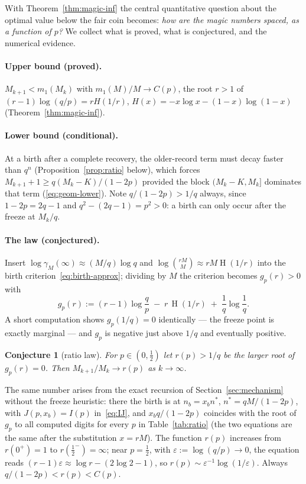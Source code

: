 \documentclass[11pt]{article}
\newtheorem{conjecture}[theorem]{Conjecture}
\theoremstyle{definition}
\DeclareMathOperator{\Hent}{H}
\begin{document}
With Theorem~\ref{thm:magic-inf} the central quantitative question
about the optimal value below the fair coin becomes: \emph{how are the
magic numbers spaced, as a function of $p$?}  We collect what is
proved, what is conjectured, and the numerical evidence.

\paragraph{Upper bound (proved).}  $M_{k+1}<m_1(M_k)$ with
$m_1(M)/M\to C(p)$, the root $r>1$ of $(r-1)\log(q/p)=rH(1/r)$,
$H(x)=-x\log x-(1-x)\log(1-x)$ (Theorem~\ref{thm:magic-inf}).

\paragraph{Lower bound (conditional).}  At a birth after a complete
recovery, the older-record term must decay faster than $q^n$
(Proposition~\ref{prop:ratio} below), which forces
$M_{k+1}+1\ge q(M_k-K)/(1-2p)$ provided the block $(M_k-K,M_k]$
dominates that term (\eqref{eq:geom-lower}).  Note
$q/(1-2p)>1/q$ always, since $1-2p=2q-1$ and $q^2-(2q-1)=p^2>0$: a
birth can only occur after the freeze at $M_k/q$.

\paragraph{The law (conjectured).}  Insert
$\log\gamma_M(\infty)\approx(M/q)\log q$ and $\log\binom{rM}{M}\approx rM\Hent(1/r)$
into the birth criterion~\eqref{eq:birth-approx}; dividing by $M$ the
criterion becomes $g_p(r)>0$ with
\begin{equation}\label{eq:g}
  g_p(r):=(r-1)\log\frac qp\;-\;r\,\Hent(1/r)\;+\;\frac1q\log\frac1q .
\end{equation}
A short computation shows $g_p(1/q)=0$ identically --- the freeze point
is exactly marginal --- and $g_p$ is negative just above $1/q$ and
eventually positive.

\begin{conjecture}[ratio law]\label{conj:ratio}
  For $p\in(0,\tfrac12)$ let $r(p)>1/q$ be the larger root of
  $g_p(r)=0$.  Then $M_{k+1}/M_k\to r(p)$ as $k\to\infty$.
\end{conjecture}

The same number arises from the exact recursion of
Section~\ref{sec:mechanism} without the freeze heuristic: there the
birth is at $n_b=x_bn^*$, $n^*=qM/(1-2p)$, with $J(p,x_b)=I(p)$
in~\eqref{eq:IJ}, and $x_bq/(1-2p)$ coincides with the root of
$g_p$ to all computed digits for every $p$ in Table~\ref{tab:ratio}
(the two equations are the same after the substitution $x=rM$).  The
function $r(p)$ increases from $r(0^+)=1$ to $r(\tfrac12^-)=\infty$;
near $p=\tfrac12$, with $\varepsilon:=\log(q/p)\to0$, the equation reads
$(r-1)\varepsilon\approx\log r-(2\log2-1)$, so
$r(p)\sim\varepsilon^{-1}\log(1/\varepsilon)$.  Always
$q/(1-2p)<r(p)<C(p)$.
\end{document}
